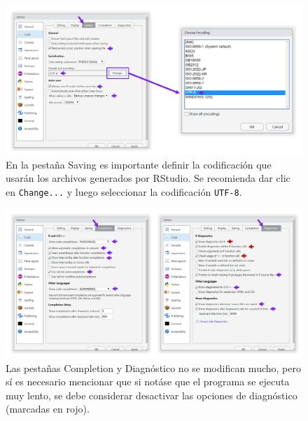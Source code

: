 \documentclass[
]{article}
\theoremstyle{definition}
\theoremstyle{definition}
\theoremstyle{definition}
\theoremstyle{definition}
\theoremstyle{remark}
\begin{document}
\begin{figure}

{\centering \includegraphics[width=1\linewidth]{figs/screenshots/configRStudio-4} 

}

\caption{En la pestaña Saving es importante definir la codificación que usarán los archivos generados por RStudio. Se recomienda dar clic en \texttt{Change...} y luego seleccionar la codificación \texttt{UTF-8}.}\label{fig:figura5}
\end{figure}



\begin{figure}

{\centering \includegraphics[width=1\linewidth]{figs/screenshots/configRStudio-6} 

}

\caption{Las pestañas Completion y Diagnóstico no se modifican mucho, pero sí es necesario mencionar que si notáse que el programa se ejecuta muy lento, se debe considerar desactivar las opciones de diagnóstico (marcadas en rojo).}\label{fig:figura6}
\end{figure}
\end{document}
